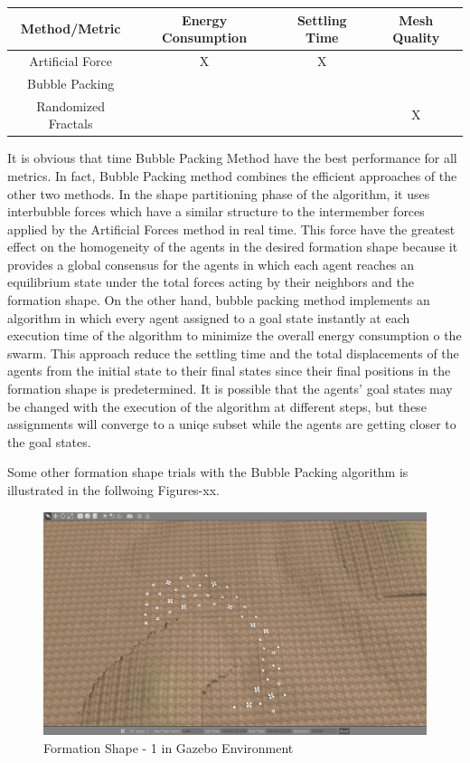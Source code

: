 \begin{center}
 \label{tab:title} 
\begin{tabular}{||c| c| c |c ||}
				
\hline
\textbf{Method/Metric} & \textbf{Energy Consumption}  & \textbf{Settling Time} & \textbf{Mesh Quality}\\ 
\hline
Artificial Force & X & X &  \\
Bubble Packing & &  &  \\	
Randomized Fractals & &  & X \\	
\hline
\end{tabular}
\end{center}
		
It is obvious that time Bubble Packing Method have the best performance for all metrics. In fact, Bubble Packing method combines the efficient approaches of the other two methods. In the shape partitioning phase of the algorithm, it uses interbubble forces which have a similar structure to the intermember forces applied by the Artificial Forces method in real time. This force have the greatest  effect on the homogeneity of the agents in the desired formation shape because it provides a global consensus for the agents in which each agent reaches an equilibrium state under the total forces acting by their neighbors and the formation shape. On the other hand, bubble packing method implements an algorithm in which every agent assigned to a goal state instantly at each execution time of the algorithm to minimize the overall energy consumption o the swarm. This approach reduce the settling time and the total displacements of the agents from the initial state to their final states since their final positions in the formation shape is predetermined. It is possible that the agents' goal states may be changed with the execution of the algorithm at different steps, but these assignments will converge to a uniqe subset while the agents are getting closer to the goal states. 
		
Some other formation shape trials with the Bubble Packing algorithm is illustrated in the follwoing Figures-xx.

\begin{figure}[H]
\caption{Formation Shape - 1 in Gazebo Environment}
\centerline{\includegraphics[scale = 0.35]{1_Gazebo}}
\end{figure} 
			
